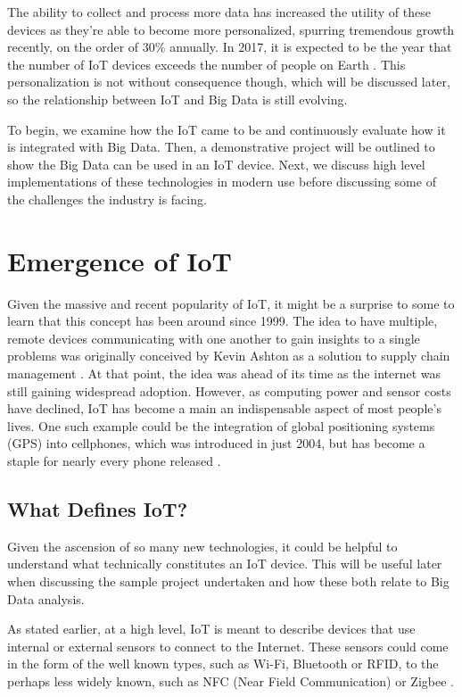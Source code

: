 \documentclass[sigconf]{acmart}
\begin{document}
The ability to collect and process more data has increased the utility of these devices as they're able to become more personalized, spurring tremendous growth recently, on the order of $30 \%$ annually. In 2017, it is expected to be the year that the number of IoT devices exceeds the number of people on Earth \cite{gartnerconnected}. This personalization is not without consequence though, which will be discussed later, so the relationship between IoT and Big Data is still evolving. 

To begin, we examine how the IoT came to be and continuously evaluate how it is integrated with Big Data. Then, a demonstrative project will be outlined to show the Big Data can be used in an IoT device. Next, we discuss high level implementations of these technologies in modern use before discussing some of the challenges the industry is facing.

\section{Emergence of IoT}
Given the massive and recent popularity of IoT, it might be a surprise to some to learn that this concept has been around since 1999. The idea to have multiple, remote devices communicating with one another to gain insights to a single problems was originally conceived by Kevin Ashton as a solution to supply chain management \cite{ashton}. At that point, the idea was ahead of its time as the internet was still gaining widespread adoption. However, as computing power and sensor costs have declined, IoT has become a main an indispensable aspect of most people's lives. One such example could be the integration of global positioning systems (GPS) into cellphones, which was introduced in just 2004, but has become a staple for nearly every phone released \cite{gps}.  
\subsection{What Defines IoT?}
Given the ascension of so many new technologies, it could be helpful to understand what technically constitutes an IoT device. This will be useful later when discussing the sample project undertaken and how these both relate to Big Data analysis. 

As stated earlier, at a high level, IoT is meant to describe devices that use internal or external sensors to connect to the Internet. These sensors could come in the form of the well known types, such as Wi-Fi, Bluetooth or RFID, to the perhaps less widely known, such as NFC (Near Field Communication) or Zigbee \cite{lopez}.
\end{document}
